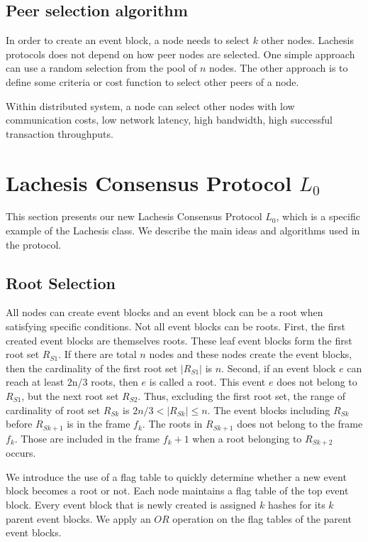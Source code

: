 \documentclass[preprint,12pt]{elsarticle}
\begin{document}
\subsection{Peer selection algorithm}
In order to create an event block, a node needs to select $k$ other nodes. Lachesis protocols does not depend on how peer nodes are selected. One simple approach can use a random selection from the pool of $n$ nodes. The other approach is to define some criteria or cost function to select other peers of a node. 

Within distributed system, a node can select other nodes with low communication costs, low network latency, high bandwidth, high successful transaction throughputs.

\section{Lachesis Consensus Protocol $L_0$}\label{se:lca}
This section presents our new Lachesis Consensus Protocol $L_0$, which is a specific example of the Lachesis class.
We describe the main ideas and algorithms used in the protocol.


\subsection{Root Selection}
All nodes can create event blocks and an event block can be a root when satisfying specific conditions. Not all event blocks can be roots. First, the first created event blocks are themselves roots. These leaf event blocks form the first root set $R_{S1}$. If there are total $n$ nodes and these nodes create the event blocks, then the cardinality of the first root set  $|R_{S1}|$ is $n$. Second, if an event block $e$ can reach at least 2n/3 roots, then $e$ is called a root. This event $e$ does not belong to $R_{S1}$, but the next root set $R_{S2}$. Thus, excluding the first root set, the range of cardinality of root set $R_{Sk}$ is $2n/3 < |R_{Sk}| \leq n$. The event blocks including $R_{Sk}$ before $R_{Sk+1}$ is in the frame $f_k$. The roots in $R_{Sk+1}$ does not belong to the frame $f_k$. Those are included in the frame $f_k+1$ when a root belonging to $R_{Sk+2}$ occurs.  

We introduce the use of a flag table to quickly determine whether a new event block becomes a root or not. Each node maintains a flag table of the top event block.
Every event block that is newly created is assigned $k$ hashes for its $k$ parent event blocks. We apply an $OR$ operation on the flag tables of the parent event blocks.
\end{document}
